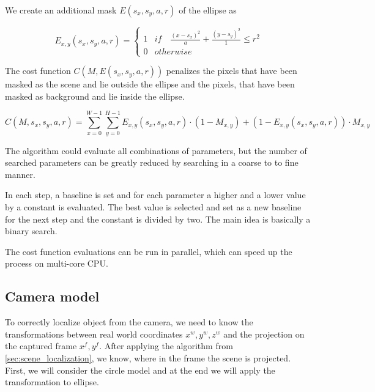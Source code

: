 \documentclass[a4paper,12pt,titlepage, twoside]{article}
\numberwithin{figure}{section}
\begin{document}
We create an additional mask $E(s_x, s_y, a, r)$ of the ellipse as 

\begin{equation}
E_{x,y}(s_x, s_y, a, r) = \begin{cases}
1 & if \quad \frac{(x-s_x)^2}{a} + \frac{(y-s_y)^2}{1} \leq r^2 \\
0 & otherwise
\end{cases}
\end{equation}

The cost function $C(M, E(s_x, s_y, a, r))$ penalizes the pixels that have been masked as the scene and lie outside the ellipse and the pixels, that have been masked as background and lie inside the ellipse.

\begin{equation}
C(M, s_x, s_y, a, r) = \sum_{x = 0}^{W-1} \sum_{y = 0}^{H-1} E_{x,y}(s_x, s_y, a, r) \cdot (1-M_{x,y}) + (1 - E_{x,y}(s_x, s_y, a, r)) \cdot M_{x,y}
\end{equation}

The algorithm could evaluate all combinations of parameters, but the number of searched parameters can be greatly reduced by searching in a coarse to to fine manner. 

In each step, a baseline is set and for each parameter a higher and a lower value by a constant is evaluated. The best value is selected and set as a new baseline for the next step and the constant is divided by two. The main idea is basically a binary search.


%
%
%    
%    
%    

The cost function evaluations can be run in parallel, which can speed up the process on multi-core CPU.

\subsection{Camera model}

To correctly localize object from the camera, we need to know the transformations between real world coordinates $x^w, y^w, z^w$ and the projection on the captured frame $x^f, y^f$. After applying the algorithm from \ref{sec:scene_localization}, we know, where in the frame the scene is projected. First, we will consider the circle model and at the end we will apply the transformation to ellipse. 
\end{document}
